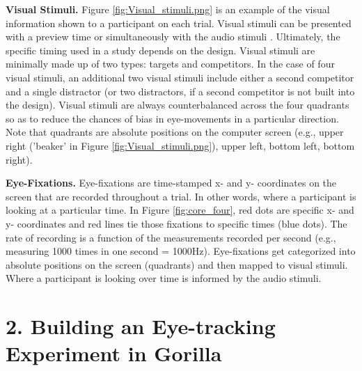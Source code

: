 \textbf{Visual Stimuli.} Figure \ref{fig:Visual_stimuli.png} is an example of the visual information shown to a participant on each trial. Visual stimuli can be presented with a preview time or simultaneously with the audio stimuli  \parencite{Apfelbaum_Klein-Packard_McMurray_2021}. Ultimately, the specific timing used in a study depends on the design. Visual stimuli are minimally made up of two types: targets and competitors. In the case of four visual stimuli, an additional two visual stimuli include either a second competitor and a single distractor (or two distractors, if a second competitor is not built into the design). Visual stimuli are always counterbalanced across the four quadrants so as to reduce the chances of bias in eye-movements in a particular direction. Note that quadrants are absolute positions on the computer screen (e.g., upper right ('beaker' in Figure \ref{fig:Visual_stimuli.png}), upper left, bottom left, bottom right). 

\textbf{Eye-Fixations.} Eye-fixations are time-stamped x- and y- coordinates on the screen that are recorded throughout a trial. In other words, where a participant is looking at a particular time. In Figure \ref{fig:core_four}, red dots are specific x- and y- coordinates and red lines tie those fixations to specific times (blue dots). The rate of recording is a function of the measurements recorded per second (e.g., measuring 1000 times in one second = 1000Hz). Eye-fixations get categorized into absolute positions on the screen (quadrants) and then mapped to visual stimuli. Where a participant is looking over time is informed by the audio stimuli.
\newline

\section{2. Building an Eye-tracking Experiment in Gorilla}

